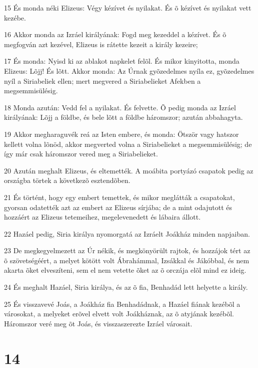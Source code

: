 \par 15 És monda néki Elizeus: Végy kézívet és nyilakat. És õ kézívet és nyilakat vett kezébe.
\par 16 Akkor monda az Izráel királyának: Fogd meg kezeddel a kézívet. És õ megfogván azt kezével, Elizeus is rátette kezeit a király kezeire;
\par 17 És monda: Nyisd ki az ablakot napkelet felõl. És mikor kinyitotta, monda Elizeus: Lõjj! És lõtt. Akkor monda: Az Úrnak gyõzedelmes nyíla ez, gyõzedelmes nyíl a Siriabeliek ellen; mert megvered a Siriabelieket Afekben a megsemmisülésig.
\par 18 Monda azután: Vedd fel a nyilakat. És felvette. Õ pedig monda az Izráel királyának: Lõjj a földbe, és bele lõtt a földbe háromszor; azután abbahagyta.
\par 19 Akkor megharaguvék reá az Isten embere, és monda: Ötször vagy hatszor kellett volna lõnöd, akkor megverted volna a Siriabelieket a megsemmisülésig; de így már csak háromszor vered meg a Siriabelieket.
\par 20 Azután meghalt Elizeus, és eltemették. A moábita portyázó csapatok pedig az országba törtek a következõ esztendõben.
\par 21 És történt, hogy egy embert temettek, és mikor meglátták a csapatokat, gyorsan odatették azt az embert az Elizeus sírjába; de a mint odajutott és hozzáért az Elizeus tetemeihez, megelevenedett és lábaira állott.
\par 22 Hazáel pedig, Siria királya nyomorgatá az Izráelt Joákház minden napjaiban.
\par 23 De megkegyelmezett az Úr nékik, és megkönyörült rajtok, és hozzájok tért az õ szövetségéért, a melyet kötött volt Ábrahámmal, Izsákkal és Jákóbbal, és nem akarta õket elveszíteni, sem el nem vetette õket az õ orczája elõl mind ez ideig.
\par 24 És meghalt Hazáel, Siria királya, és az õ fia, Benhadád lett helyette a király.
\par 25 És visszavevé Joás, a Joákház fia Benhadádnak, a Hazáel fiának kezébõl a városokat, a melyeket erõvel elvett volt Joákháznak, az õ atyjának kezébõl. Háromszor veré meg õt Joás, és visszaszerezte Izráel városait.

\chapter{14}

